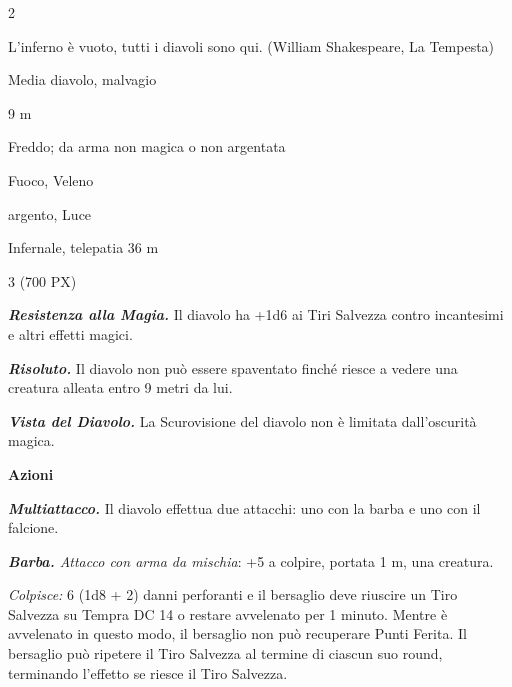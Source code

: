 \begin{multicols}{2}
{\begin{enfasi}{L'inferno è vuoto, tutti i diavoli sono qui. (William Shakespeare, La Tempesta)}\end{enfasi}

\begin{description}[noitemsep, topsep=0pt, parsep=0pt, partopsep=0pt, itemsep=1pt, leftmargin=2.35cm,  labelwidth=2.2cm, itemindent=0cm, listparindent=0pt] %
\setlength{\baselineskip}{10pt}
\item[\textbf{Taglia/Tipo}] Media diavolo, malvagio
\item[\textbf{Caratt.}] 
\item[\textbf{Punti Ferita}] 
\item[\textbf{Movimento}] 9 m
\item[\textbf{Tiri Salvez.}] 
\item[\textbf{Res. Danni}] Freddo; da arma non magica o non argentata
\item[\textbf{Imm. Danni}] Fuoco, Veleno
\item[\textbf{Vulnerabilità}] argento, Luce
\item[\textbf{Sensi}] 
\item[\textbf{Linguaggi}] Infernale, telepatia 36 m
\item[\textbf{Sfida}] 3 (700 PX)
\end{description}
\smallskip

\emph{\textbf{Resistenza alla Magia.}} Il diavolo ha +1d6 ai Tiri Salvezza contro incantesimi e altri effetti magici.

\emph{\textbf{Risoluto.}} Il diavolo non può essere spaventato finché riesce a vedere una creatura alleata entro 9 metri da lui.

\emph{\textbf{Vista del Diavolo.}} La Scurovisione del diavolo non è limitata dall'oscurità magica.

\textbf{Azioni}

\emph{\textbf{Multiattacco.}} Il diavolo effettua due attacchi: uno con la barba e uno con il falcione.

\emph{\textbf{Barba.} Attacco con arma da mischia}: +5 a colpire, portata 1 m, una creatura.

\emph{Colpisce:} 6 (1d8 + 2) danni perforanti e il bersaglio deve riuscire un Tiro Salvezza su Tempra DC 14 o restare avvelenato per 1 minuto. Mentre è avvelenato in questo modo, il bersaglio non può recuperare Punti Ferita. Il bersaglio può ripetere il Tiro Salvezza al termine di ciascun suo round, terminando l'effetto se riesce il Tiro Salvezza.

}
\end{multicols}
